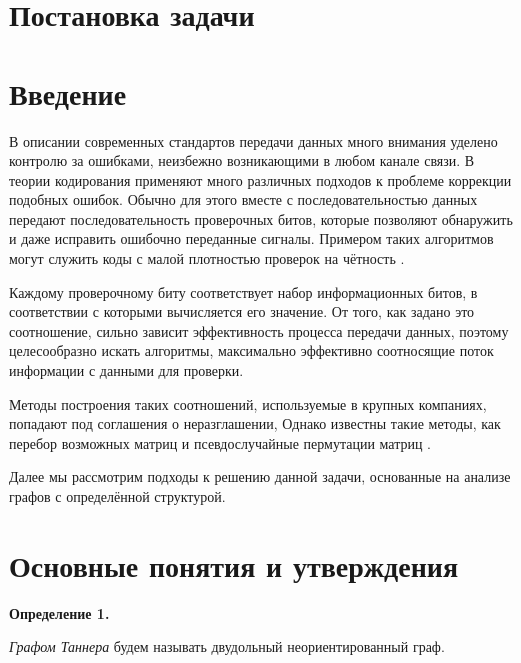 \documentclass[14pt]{mmcs_article}
\begin{document}


\renewcommand{\contentsname}{Оглавление}

\tableofcontents

\newpage
{}

\section*{Постановка задачи}

\newpage
{}
\section*{Введение}

В описании современных стандартов передачи данных много внимания уделено контролю за ошибками, неизбежно возникающими в любом канале связи. В теории кодирования применяют много различных подходов к проблеме коррекции подобных ошибок. Обычно для этого вместе с последовательностью данных передают последовательность проверочных битов, которые позволяют обнаружить и даже исправить ошибочно переданные сигналы. Примером таких алгоритмов могут служить коды с малой плотностью проверок на чётность \cite{johnson}.

Каждому проверочному биту соответствует набор информационных битов, в соответствии с которыми вычисляется его значение. От того, как задано это соотношение, сильно зависит эффективность процесса передачи данных, поэтому целесообразно искать алгоритмы, максимально эффективно соотносящие поток информации с данными для проверки.

Методы построения таких соотношений, используемые в крупных компаниях, попадают под соглашения о неразглашении, Однако известны такие методы, как перебор возможных матриц \cite{bruteforce} и псевдослучайные пермутации матриц \cite{permutations}.

Далее мы рассмотрим подходы к решению данной задачи, основанные на анализе графов с определённой структурой.

\newpage
\section{Основные понятия и утверждения}\label{dsfs}

\textbf{Определение 1.}

\textsl{Графом Таннера} будем называть двудольный неориентированный граф.
\end{document}
